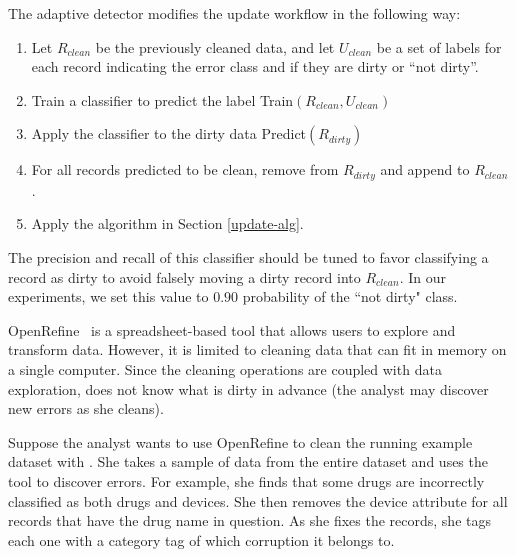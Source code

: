 The adaptive detector modifies the update workflow in the following way:
\begin{enumerate}
\item Let $R_{clean}$ be the previously cleaned data, and let $U_{clean}$ be a set of labels for each record indicating the error class and if they are dirty or ``not dirty''.
\item Train a classifier to predict the label \textsf{Train}$(R_{clean}, U_{clean})$
\item Apply the classifier to the dirty data \textsf{Predict}$(R_{dirty})$
\item For all records predicted to be clean, remove from $R_{dirty}$ and append to $R_{clean}$.
\item Apply the algorithm in Section \ref{update-alg}.
\end{enumerate}

The precision and recall of this classifier should be tuned to favor classifying a record as dirty to avoid falsely moving a dirty record into $R_{clean}$. In our experiments, we set this value to $0.90$ probability of the ``not dirty" class.

\vspace{0.75em}

\begin{example}\label{detex2}
OpenRefine~\cite{or} is a spreadsheet-based tool that allows users to explore and transform data.
However, it is limited to cleaning data that can fit in memory on a single computer.
Since the cleaning operations are coupled with data exploration, \sys does not know what is dirty in advance (the analyst may discover new errors as she cleans).

Suppose the analyst wants to use OpenRefine to clean the running example dataset with \sys.
She takes a sample of data from the entire dataset and uses the tool to discover errors.
For example, she finds that some drugs are incorrectly classified as both drugs and devices.
She then removes the device attribute for all records that have the drug name in question.
As she fixes the records, she tags each one with a category tag of which corruption it belongs to.
\end{example}





